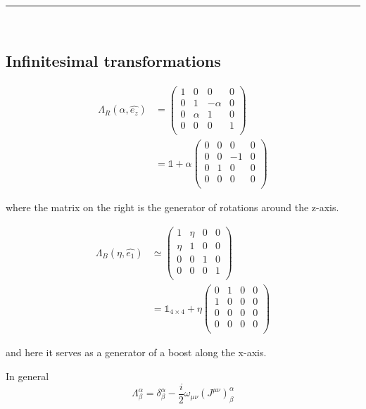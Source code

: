 \documentclass[11pt]{article}
\begin{document}
	{\hfill \color{VioletRed} \rule{0.5\textwidth}{0.4pt} \hfill }\\
	\vspace{-24pt}
	\subsection*{Infinitesimal transformations}
	\begin{align*}
		\Lambda_R(\alpha, \hat{e_z}) & = \begin{pmatrix}
			1 & 0 & 0 & 0\\
			0 & 1 & -\alpha & 0\\
			0 & \alpha & 1 & 0\\
			0 & 0 & 0 & 1\\
		\end{pmatrix}\\	
	& = \mathbb{1} + \alpha \begin{pmatrix}
		0 & 0 &0& 0\\
		0 & 0 & -1 & 0\\
		0 & 1 & 0 & 0 \\
		0 & 0& 0& 0\\
	\end{pmatrix}
	\end{align*}
	 

where the matrix on the right is the generator of rotations around the z-axis.

\begin{align*}
	\Lambda_B (\eta, \hat{e_1}) & \simeq \begin{pmatrix}
		1 & \eta & 0 & 0\\
		\eta & 1 & 0 & 0\\
		0 & 0 & 1 & 0\\
		0 & 0&  0 & 1\\
	\end{pmatrix}\\
		& = \mathbb{1}_{4\times 4} + \eta \begin{pmatrix}
		0 & 1 & 0 & 0\\
		1 & 0 & 0 & 0\\
		0 & 0 & 0 & 0\\
		0 & 0 & 0 & 0\\
	\end{pmatrix}
\end{align*}


and here it serves as a generator  of a boost along the x-axis.

In general \[ \Lambda^\alpha_\beta = \delta^\alpha_\beta - \frac{i}{2} \omega_{\mu\nu} (J^{\mu\nu})^\alpha_\beta\]
\end{document}

